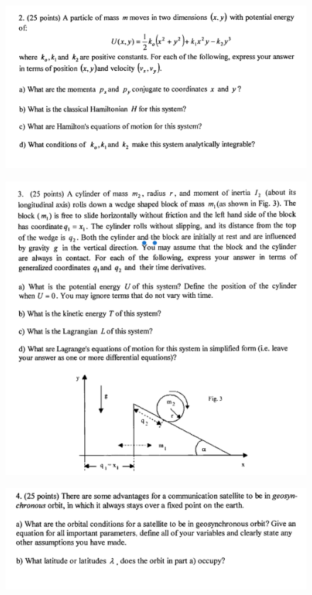 \documentclass[10pt,a4paper]{article}
\begin{document}
 \newpage
\begin{figure}[H]
 \centering
 \includegraphics[width=16cm]{pdf/1-1T7.png}
\end{figure}
 \newpage
\begin{figure}[H]
 \centering
 \includegraphics[width=16cm]{pdf/1-1T8.png}
\end{figure}
 \newpage
\begin{figure}[H]
 \centering
 \includegraphics[width=16cm]{pdf/1-1T9.png}
\end{figure}
 \newpage
 
\end{document}

